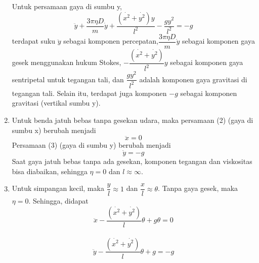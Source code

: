 \documentclass[12pt]{article}
\begin{document}
\begin{enumerate}[label=(\alph*)]
		Untuk persamaan gaya di sumbu y, 
		\begin{equation}
		\ddot{y} + \dfrac{3\pi\eta D}{m} \dot{y} + \dfrac {({\dot{x^2}+\dot{y^2}})y}{l^2} -\dfrac{gy^2}{l^2} = -g
		\end{equation}
		terdapat suku $\ddot{y}$ sebagai komponen percepatan,$ \dfrac{3\pi\eta D}{m} \dot{y} $ sebagai komponen gaya gesek menggunakan hukum Stokes, $-\dfrac{(\dot{x^2}+\dot{y^2})}{l^2}y$ sebagai komponen gaya sentripetal untuk tegangan tali, dan $\dfrac{gy^2}{l^2}$ adalah komponen gaya gravitasi di tegangan tali. Selain itu, terdapat juga komponen $-g$ sebagai komponen gravitasi (vertikal sumbu y).
		\item 
		Untuk benda jatuh bebas tanpa gesekan udara,  maka persamaan (2) (gaya di sumbu x) berubah menjadi
		\begin{equation}
		\ddot{x} = 0
		\end{equation}
		Persamaan (3) (gaya di sumbu y) berubah menjadi
		\begin{equation}
		\ddot{y} = -g
		\end{equation}
		Saat gaya jatuh bebas tanpa ada gesekan, komponen tegangan dan viskositas bisa diabaikan, sehingga $\eta =0$ dan $ l \approx \infty$.
		\item 
		Untuk simpangan kecil, maka $\dfrac{y}{l} \approx 1$ dan $\dfrac{x}{l} \approx \theta$. Tanpa gaya gesek, maka $\eta =0$.
			Sehingga, didapat 
		\begin{equation}
		\ddot{x} - \dfrac{(\dot{x^2}+\dot{y^2})}{l}\theta + g\theta =0
		\end{equation} \\
		\begin{equation}
		\ddot{y} - \dfrac{(\dot{x^2}+\dot{y^2})}{l}\theta + g =-g
		\end{equation}\\
	\end{enumerate}
\end{document}
